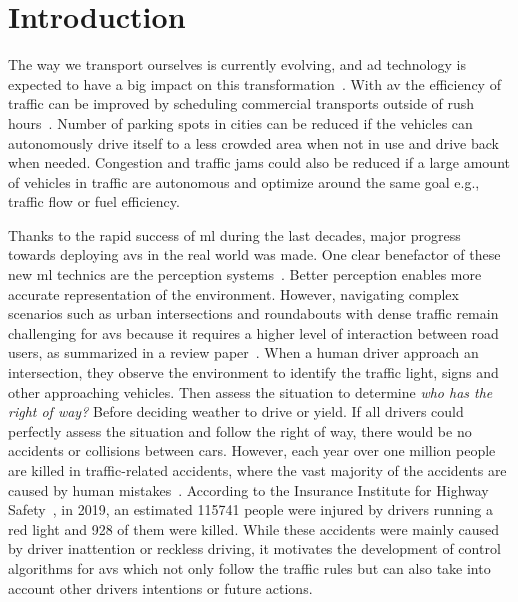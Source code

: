 \chapter{Introduction} \label{ch:intro}
The way we transport ourselves is currently evolving, and \gls{ad} technology is expected to have a big impact on this transformation~\cite{traffic21, McKinsey2023}. With \gls{av} the efficiency of traffic can be improved by scheduling commercial transports outside of rush hours~\cite{FAGNANT2015167}. Number of parking spots in cities can be reduced if the vehicles can autonomously drive itself to a less crowded area when not in use and drive back when needed. Congestion and traffic jams could also be reduced if a large amount of vehicles in traffic are autonomous and optimize around the same goal e.g., traffic flow or fuel efficiency. 

Thanks to the rapid success of \gls{ml} during the last decades, major progress towards deploying \gls{av}s in the real world was made. One clear benefactor of these new \gls{ml} technics are the perception systems~\cite{Janai2020}. Better perception enables more accurate representation of the environment. 
However, navigating complex scenarios such as urban intersections and roundabouts with dense traffic remain challenging for \gls{av}s because it requires a higher level of interaction between road users, as summarized in a review paper~\cite{Schwarting2018}. 
When a human driver approach an intersection, they observe the environment to identify the traffic light, signs and other approaching vehicles. Then assess the situation to determine \textit{who has the right of way?} Before deciding weather to drive or yield. 
If all drivers could perfectly assess the situation and follow the right of way, there would be no accidents or collisions between cars. However, each year over one million people are killed in traffic-related accidents, where the vast majority of the accidents are caused by human mistakes~\cite{WHO2018, NHTSA2018}. According to the Insurance Institute for Highway Safety~\cite{IIHS2019}, in 2019, an estimated \num{115741} people were injured by drivers running a red light and \num{928} of them were killed. 
While these accidents were mainly caused by driver inattention or reckless driving, it motivates the development of control algorithms for \gls{av}s which not only follow the traffic rules but can also take into account other drivers intentions or future actions.


